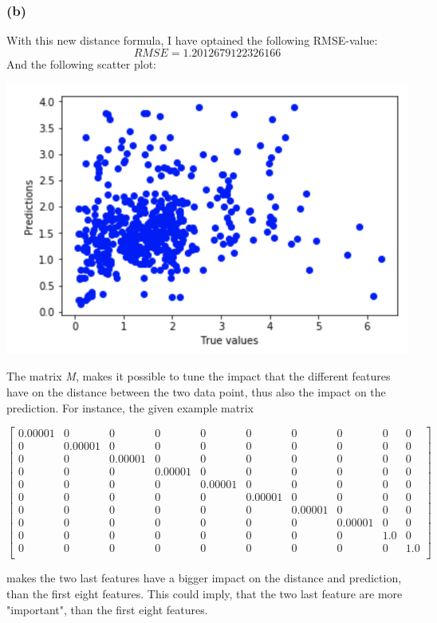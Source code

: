 \documentclass{report}
\begin{document}
\subsubsection*{(b)}
With this new distance formula, I have optained the following RMSE-value:
$$RMSE = 1.2012679122326166$$
And the following scatter plot:
\begin{center}
    \includegraphics[height = 7 cm]{kNN_Scatter_b}
\end{center}
The matrix \textit{M}, makes it possible to tune the impact that the different features have on the distance between the two data point, thus also the impact on the prediction. For instance, the given example matrix
\begin{center}
    \begin{math}
        \left[
        \begin{array}{cccccccccc}
            0.00001 & 0 & 0 & 0 & 0 & 0 & 0 & 0 & 0 & 0 \\
            0 & 0.00001 & 0 & 0 & 0 & 0 & 0 & 0 & 0 & 0 \\
            0 & 0 & 0.00001 & 0 & 0 & 0 & 0 & 0 & 0 & 0 \\
            0 & 0 & 0 & 0.00001 & 0 & 0 & 0 & 0 & 0 & 0 \\
            0 & 0 & 0 & 0 & 0.00001 & 0 & 0 & 0 & 0 & 0 \\
            0 & 0 & 0 & 0 & 0 & 0.00001 & 0 & 0 & 0 & 0 \\
            0 & 0 & 0 & 0 & 0 & 0 & 0.00001 & 0 & 0 & 0 \\
            0 & 0 & 0 & 0 & 0 & 0 & 0 & 0.00001 & 0 & 0 \\
            0 & 0 & 0 & 0 & 0 & 0 & 0 & 0 & 1.0 & 0 \\
            0 & 0 & 0 & 0 & 0 & 0 & 0 & 0 & 0 & 1.0 \\
        \end{array}
        \right]
    \end{math}
\end{center}
makes the two last features have a bigger impact on the distance and prediction, than the first eight features. This could imply, that the two last feature are more "important", than the first eight features.
\end{document}
